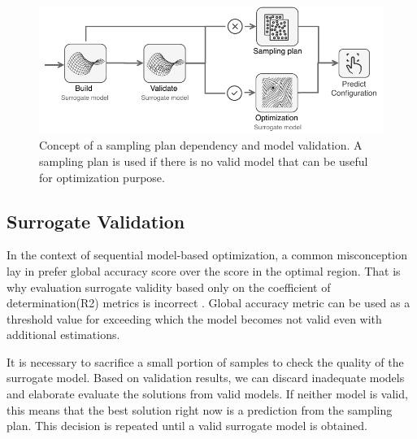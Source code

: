             \begin{figure}
                \centering
                \includegraphics[width=\textwidth]{content/images/dinamic_sampling_plan}
                \caption[Non-dominated points]{Concept of a sampling plan dependency and model validation. A sampling plan is used if there is no valid model that can be useful for optimization purpose.} 
                \label{fig:concept_sampling} 
            \end{figure}      

        \subsection{Surrogate Validation}
        In the context of sequential model-based optimization, a common misconception lay in prefer global accuracy score over the score in the optimal region. That is why evaluation surrogate validity based only on the coefficient of determination(R2) metrics is incorrect \cite{nardi2019practical}. Global accuracy metric can be used as a threshold value for exceeding which the model becomes not valid even with additional estimations. 

        It is necessary to sacrifice a small portion of samples to check the quality of the surrogate model. Based on validation results, we can discard inadequate models and elaborate evaluate the solutions from valid models. If neither model is valid, this means that the best solution right now is a prediction from the sampling plan. This decision is repeated until a valid surrogate model is obtained.



